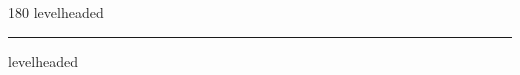 
\begin{frame}
\begin{center}
\begin{turn}{180}
{\fontsize{2.5cm}{1em}\selectfont levelheaded}
\end{turn}
\vspace{1em}\par  
\hrule
\vspace{1em}\par  
{\fontsize{2.5cm}{1em}\selectfont levelheaded}
\end{center}
\end{frame}
